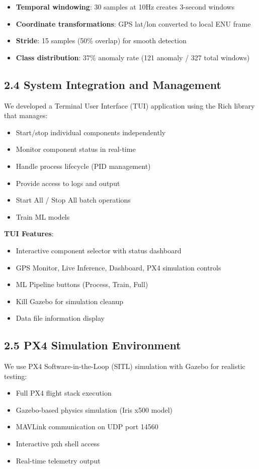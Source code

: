 \begin{itemize}
    \item \textbf{Temporal windowing}: 30 samples at 10Hz creates 3-second windows
    \item \textbf{Coordinate transformations}: GPS lat/lon converted to local ENU frame
    \item \textbf{Stride}: 15 samples (50\% overlap) for smooth detection
    \item \textbf{Class distribution}: 37\% anomaly rate (121 anomaly / 327 total windows)
\end{itemize}

\subsection{2.4 System Integration and Management}

We developed a Terminal User Interface (TUI) application using the Rich library that manages:

\begin{itemize}
    \item Start/stop individual components independently
    \item Monitor component status in real-time
    \item Handle process lifecycle (PID management)
    \item Provide access to logs and output
    \item Start All / Stop All batch operations
    \item Train ML models
\end{itemize}

\textbf{TUI Features}:
\begin{itemize}
    \item Interactive component selector with status dashboard
    \item GPS Monitor, Live Inference, Dashboard, PX4 simulation controls
    \item ML Pipeline buttons (Process, Train, Full)
    \item Kill Gazebo for simulation cleanup
    \item Data file information display
\end{itemize}

\subsection{2.5 PX4 Simulation Environment}

We use PX4 Software-in-the-Loop (SITL) simulation with Gazebo for realistic testing:

\begin{itemize}
    \item Full PX4 flight stack execution
    \item Gazebo-based physics simulation (Iris x500 model)
    \item MAVLink communication on UDP port 14560
    \item Interactive pxh shell access
    \item Real-time telemetry output
\end{itemize}